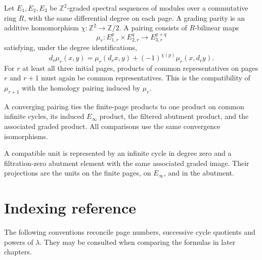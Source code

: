 \begin{definition}
\label{sem:SpectralSequence:pairing}
Let $E_1,E_2,E_3$ be $\mathbb Z^2$-graded spectral sequences of modules
over a commutative ring $R$, with the same differential degree on each
page. A grading parity is an additive homomorphism
$\chi:\mathbb Z^2\to\mathbb Z/2$. A pairing consists of $R$-bilinear maps
\[
 \mu_r:E_{1,r}^p\times E_{2,r}^q\longrightarrow E_{3,r}^{p+q}
\]
satisfying, under the degree identifications,
\[
 d_r\mu_r(x,y)=\mu_r(d_rx,y)+(-1)^{\chi(p)}\mu_r(x,d_ry).
\]
For $r$ at least all three initial pages, products of common
representatives on pages $r$ and $r+1$ must again be common
representatives. This is the compatibility of $\mu_{r+1}$ with the
homology pairing induced by $\mu_r$.

A converging pairing ties the finite-page products to one product on common infinite cycles, its induced $E_\infty$ product, the filtered abutment product, and the associated graded product. All comparisons use the same convergence isomorphisms.

A compatible unit is represented by an infinite cycle in degree zero
and a filtration-zero abutment element with the same associated graded
image. Their projections are the units on the finite pages, on
$E_\infty$, and in the abutment.
\end{definition}

\section{Indexing reference}

The following conventions reconcile page numbers, successive cycle
quotients and powers of $\lambda$. They may be consulted when comparing
the formulas in later chapters.

